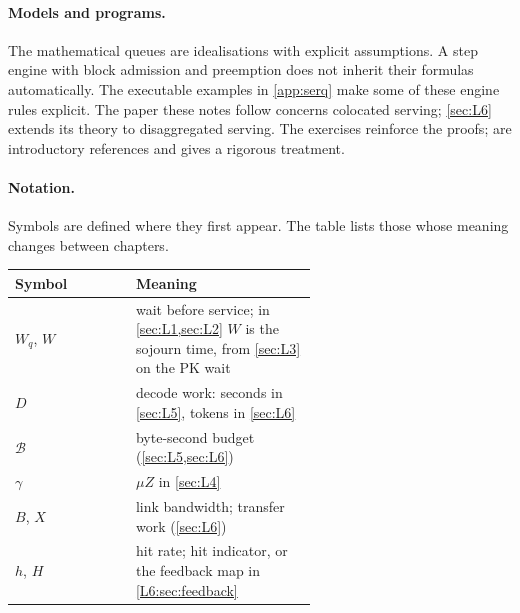 \paragraph{Models and programs.} The mathematical queues are idealisations with
explicit assumptions. A step engine with block admission and preemption does not
inherit their formulas automatically. The executable examples in \cref{app:serq}
make some of these engine rules explicit. The paper these notes follow concerns
colocated serving; \cref{sec:L6} extends its theory to disaggregated serving. The exercises reinforce the proofs;
\cite{kleinrock1975,harchol2013} are introductory references and \cite{asmussen2003}
gives a rigorous treatment.

\paragraph{Notation.} Symbols are defined where they first appear. The table lists
those whose meaning changes between chapters.
\begin{center}\small
\begin{tabular}{@{}lp{0.6\linewidth}@{}}
\toprule
Symbol & Meaning \\
\midrule
$W_q$, $W$ & wait before service; in \cref{sec:L1,sec:L2} $W$ is the sojourn time,
  from \cref{sec:L3} on the PK wait \\
$D$ & decode work: seconds in \cref{sec:L5}, tokens in \cref{sec:L6} \\
$\mathcal B$ & byte-second budget (\cref{sec:L5,sec:L6}) \\
$\gamma$ & $\mu Z$ in \cref{sec:L4} \\
$B$, $X$ & link bandwidth; transfer work (\cref{sec:L6}) \\
$h$, $H$ & hit rate; hit indicator, or the feedback map in \cref{L6:sec:feedback} \\
\bottomrule
\end{tabular}
\end{center}
